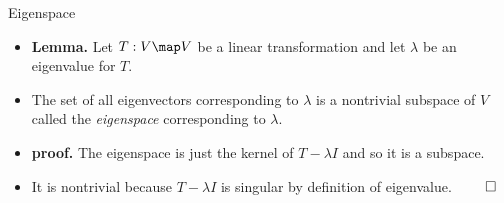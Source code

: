 \documentclass{beamer}
\begin{document}
\begin{frame}{Eigenspace}

\begin{itemize}
\item \textbf{Lemma.} Let $T:V\map V$ be a linear transformation and let
$\lambda$ be an eigenvalue for $T$.
\item The set of all eigenvectors corresponding
to $\lambda$ is a nontrivial subspace of $V$ called the \emph{eigenspace} corresponding
to $\lambda$.
\item \textbf{proof.} The eigenspace is just the kernel of $T-\lambda I$ and so
it is a subspace.
\item It is nontrivial because $T - \lambda I$ is singular by definition of eigenvalue. $\qed$
\end{itemize}
\end{frame}
\end{document}

